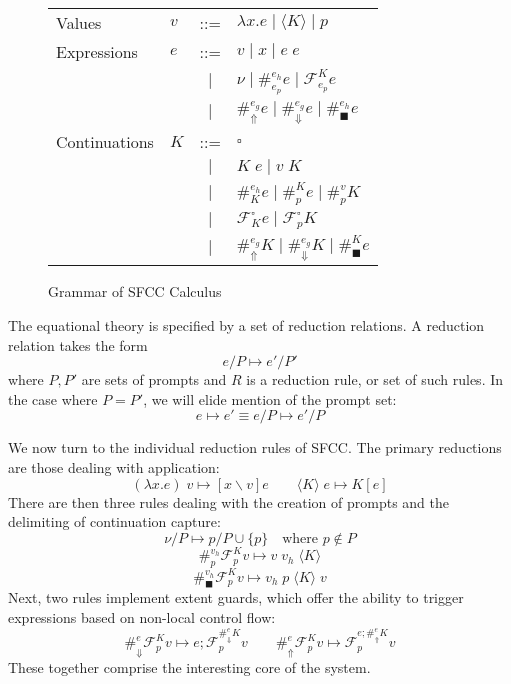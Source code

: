 \documentclass[11pt]{article}
\newcommand\x{\lambda x}
\newcommand\F{\mathcal{F}}
\newcommand{\angles}[1]{\langle#1\rangle}
\begin{document}
\begin{figure}[H]
\caption{Grammar of SFCC Calculus}
\label{fig:SFCCgrammar}

\renewcommand{\arraystretch}{1.5}
\begin{tabular}{llcl}
Values & $v$ & ::= & $\lambda x.e \mid \angles{K} \mid p$ \\
Expressions & $e$ & ::= &
          $v \mid
           x \mid
           e\;e$ \\
& & $|$ & $\nu \mid
           \#_{e_p}^{e_h}e \mid
           \F_{e_p}^Ke$ \\
& & $|$ & $\#_\Uparrow^{e_g}e \mid
           \#_\Downarrow^{e_g}e \mid
           \#_\blacksquare^{e_h}e$ \\
Continuations & $K$ & ::= &
          $\square$ \\
& & $|$ & $K\;e \mid v\;K$ \\
& & $|$ & $\#_{K}^{e_h}e \mid
           \#_{p}^{K}e \mid
           \#_{p}^{v}K$ \\
& & $|$ & $\F_{K}^{\square}e \mid
           \F_{p}^{\square}K$ \\
& & $|$ & $\#_{\Uparrow}^{e_g}K \mid
           \#_{\Downarrow}^{e_g}K \mid
           \#_{\blacksquare}^{K}e$ \\
\end{tabular}
\end{figure}


The equational theory is specified by a set of reduction relations.
A reduction relation takes the form
$$e/P \mapsto e'/P'$$
where $P, P'$ are sets of prompts and $R$ is a reduction rule, or set of such rules.
In the case where $P = P'$, we will elide mention of the prompt set:
$$e \mapsto e' \equiv e/P \mapsto e'/P$$


We now turn to the individual reduction rules of SFCC.
The primary reductions are those dealing with application:
$$(\x.e)\;v \mapsto [x \backslash v]e \qquad
  \angles{K}\;e \mapsto K[e]$$
There are then three rules dealing with the creation of prompts and the delimiting of continuation capture:
$$\nu/P \mapsto p/P\cup\{p\} \quad\textrm{where }p \notin P$$
$$\#_p^{v_h}\F_p^Kv \mapsto v\;v_h\;\angles K$$
$$\#_\blacksquare^{v_h}\F_p^K v \mapsto v_h\;p\;\angles{K}\;v$$
Next, two rules implement extent guards, which offer the ability to trigger expressions based on non-local control flow:
$$\#_{\Downarrow}^{e}\F_p^K v \mapsto e;\F_p^{\#_\Downarrow^{e}K}v \qquad
  \#_{\Uparrow}^{e}\F_p^K v \mapsto \F_p^{e;\#_\Uparrow^{e}K}v$$
These together comprise the interesting core of the system.
\end{document}
